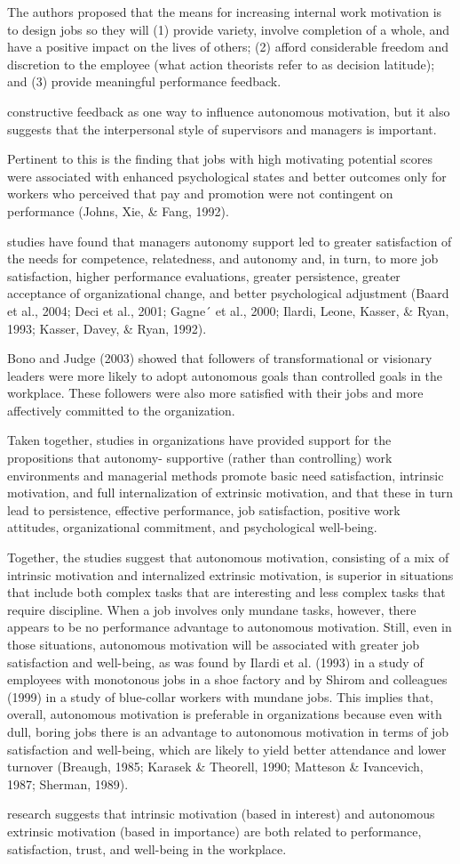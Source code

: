 The authors proposed that the means for increasing internal work motivation is to design jobs so they will (1) provide variety, involve completion of a whole, and have a positive impact on the lives of others; (2) afford considerable freedom and discretion to the employee (what action theorists refer to as decision latitude); and (3) provide meaningful performance feedback.

constructive feedback as one way to influence autonomous motivation, but it also suggests that the interpersonal style of supervisors and managers is important.

Pertinent to this is the ﬁnding that jobs with high motivating potential scores were associated with enhanced psychological states and better outcomes only for workers who perceived that pay and promotion were not contingent on performance (Johns, Xie, & Fang, 1992).

studies have found that managers autonomy support led to greater satisfaction of the needs for competence, relatedness, and autonomy and, in turn, to more job satisfaction, higher performance evaluations, greater persistence, greater acceptance of organizational change, and better psychological adjustment (Baard et al., 2004; Deci et al., 2001; Gagne´ et al., 2000; Ilardi, Leone, Kasser, \& Ryan, 1993; Kasser, Davey, & Ryan, 1992).

Bono and Judge (2003) showed that followers of transformational or visionary leaders were more likely to adopt autonomous goals than controlled goals in the workplace. These followers were also more satisfied with their jobs and more affectively committed to the organization.

Taken together, studies in organizations have provided support for the propositions that autonomy-
supportive (rather than controlling) work environments and managerial methods promote basic need satisfaction, intrinsic motivation, and full internalization of extrinsic motivation, and that these in turn lead to persistence, effective performance, job satisfaction, positive work attitudes, organizational commitment, and psychological well-being.


Together, the studies suggest that autonomous motivation, consisting of a mix of intrinsic motivation and internalized extrinsic motivation, is superior in situations that include both complex tasks that are interesting and less complex tasks that require discipline. When a job involves only mundane tasks, however, there appears to be no performance advantage to autonomous motivation. Still, even in those situations, autonomous motivation will be associated with greater job satisfaction and well-being, as was found by Ilardi et al. (1993) in a study of employees with monotonous jobs in a shoe factory and by Shirom and colleagues (1999) in a study of blue-collar workers with mundane jobs. This implies that, overall, autonomous motivation is preferable in organizations because even with dull, boring jobs there is an advantage to autonomous motivation in terms of job satisfaction and well-being, which are likely to yield better attendance and lower turnover (Breaugh, 1985; Karasek & Theorell, 1990; Matteson \& Ivancevich, 1987; Sherman, 1989).

research suggests that intrinsic motivation (based in interest) and autonomous extrinsic motivation (based in importance) are both related to performance, satisfaction, trust, and well-being in the workplace.